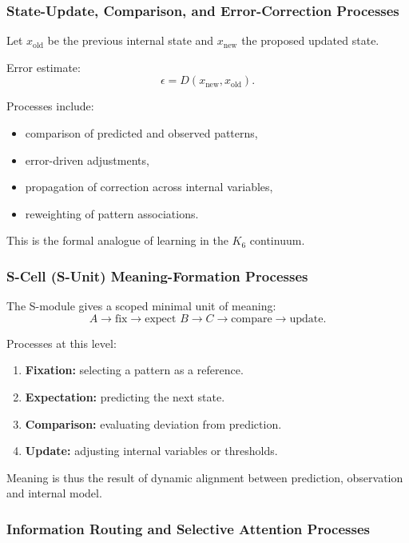 \subsubsection{State-Update, Comparison, and Error-Correction Processes}

Let $x_{\text{old}}$ be the previous internal state and
$x_{\text{new}}$ the proposed updated state.

Error estimate:
\[
\epsilon = D(x_{\text{new}}, x_{\text{old}}).
\]

Processes include:
\begin{itemize}
    \item comparison of predicted and observed patterns,
    \item error-driven adjustments,
    \item propagation of correction across internal variables,
    \item reweighting of pattern associations.
\end{itemize}

This is the formal analogue of learning in the $K_6$ continuum.

\subsubsection{S-Cell (S-Unit) Meaning-Formation Processes}

The S-module gives a scoped minimal unit of meaning:
\[
A \to \text{fix} \to \text{expect } B \to C \to \text{compare} \to
\text{update}.
\]

Processes at this level:
\begin{enumerate}
    \item \textbf{Fixation:}
    selecting a pattern as a reference.
    \item \textbf{Expectation:}
    predicting the next state.
    \item \textbf{Comparison:}
    evaluating deviation from prediction.
    \item \textbf{Update:}
    adjusting internal variables or thresholds.
\end{enumerate}

Meaning is thus the result of dynamic alignment between prediction,
observation and internal model.

\subsubsection{Information Routing and Selective Attention Processes}

